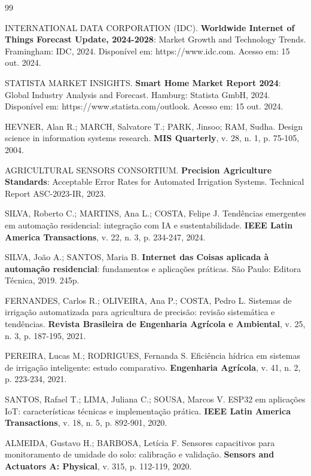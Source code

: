 \documentclass[twoside,english,brazilian]{UNISINOSmonografia}
\begin{document}

\begin{thebibliography}{99}

INTERNATIONAL DATA CORPORATION (IDC). \textbf{Worldwide Internet of Things Forecast Update, 2024-2028}: Market Growth and Technology Trends. Framingham: IDC, 2024. Disponível em: https://www.idc.com. Acesso em: 15 out. 2024.

STATISTA MARKET INSIGHTS. \textbf{Smart Home Market Report 2024}: Global Industry Analysis and Forecast. Hamburg: Statista GmbH, 2024. Disponível em: https://www.statista.com/outlook. Acesso em: 15 out. 2024.

HEVNER, Alan R.; MARCH, Salvatore T.; PARK, Jinsoo; RAM, Sudha. Design science in information systems research. \textbf{MIS Quarterly}, v. 28, n. 1, p. 75-105, 2004.

AGRICULTURAL SENSORS CONSORTIUM. \textbf{Precision Agriculture Standards}: Acceptable Error Rates for Automated Irrigation Systems. Technical Report ASC-2023-IR, 2023.

SILVA, Roberto C.; MARTINS, Ana L.; COSTA, Felipe J. Tendências emergentes em automação residencial: integração com IA e sustentabilidade. \textbf{IEEE Latin America Transactions}, v. 22, n. 3, p. 234-247, 2024.

SILVA, João A.; SANTOS, Maria B. \textbf{Internet das Coisas aplicada à automação residencial}: fundamentos e aplicações práticas. São Paulo: Editora Técnica, 2019. 245p.

FERNANDES, Carlos R.; OLIVEIRA, Ana P.; COSTA, Pedro L. Sistemas de irrigação automatizada para agricultura de precisão: revisão sistemática e tendências. \textbf{Revista Brasileira de Engenharia Agrícola e Ambiental}, v. 25, n. 3, p. 187-195, 2021.

PEREIRA, Lucas M.; RODRIGUES, Fernanda S. Eficiência hídrica em sistemas de irrigação inteligente: estudo comparativo. \textbf{Engenharia Agrícola}, v. 41, n. 2, p. 223-234, 2021.

SANTOS, Rafael T.; LIMA, Juliana C.; SOUSA, Marcos V. ESP32 em aplicações IoT: características técnicas e implementação prática. \textbf{IEEE Latin America Transactions}, v. 18, n. 5, p. 892-901, 2020.

ALMEIDA, Gustavo H.; BARBOSA, Letícia F. Sensores capacitivos para monitoramento de umidade do solo: calibração e validação. \textbf{Sensors and Actuators A: Physical}, v. 315, p. 112-119, 2020.


\end{thebibliography}
\end{document}

